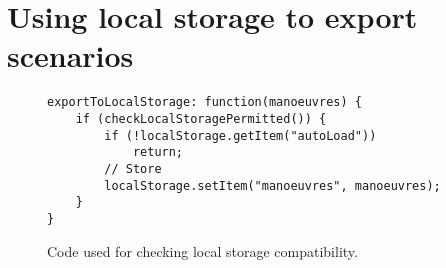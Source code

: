 \section{Using local storage to export scenarios}
\label{code:localStorage}
\begin{figure}[h!]
\caption{Code used for checking local storage compatibility.}
\begin{lstlisting}
exportToLocalStorage: function(manoeuvres) {
    if (checkLocalStoragePermitted()) {
        if (!localStorage.getItem("autoLoad"))
            return;
        // Store
        localStorage.setItem("manoeuvres", manoeuvres);
    }
}
\end{lstlisting}
\end{figure}